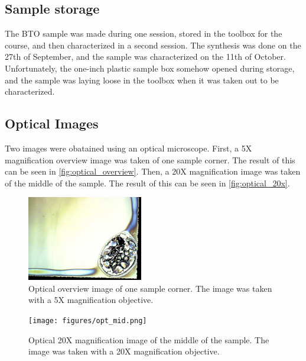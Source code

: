 \subsection{Sample storage}
\label{sec:sample-storage}
\noindent The BTO sample was made during one session, stored in the toolbox for the course, and then characterized in a second session.
The synthesis was done on the 27th of September, and the sample was characterized on the 11th of October.
Unfortunately, the one-inch plastic sample box somehow opened during storage, and the sample was laying loose in the toolbox when it was taken out to be characterized.




\subsection{Optical Images}

\noindent Two images were obatained using an optical microscope.
First, a 5X magnification overview image was taken of one sample corner.
The result of this can be seen in \autoref{fig:optical_overview}.
Then, a 20X magnification image was taken of the middle of the sample.
The result of this can be seen in \autoref{fig:optical_20x}.

\begin{figure}
    \centering
    \includegraphics[width=0.45\textwidth]{figures/opt_corner.png}
    \caption{
        Optical overview image of one sample corner.
        The image was taken with a 5X magnification objective.
    }
    \label{fig:optical_overview}
\end{figure}

\begin{figure}
    \centering
    \texttt{[image: figures/opt\_mid.png]}
    \caption{
        Optical 20X magnification image of the middle of the sample.
        The image was taken with a 20X magnification objective.
    }
    \label{fig:optical_20x}
\end{figure}


